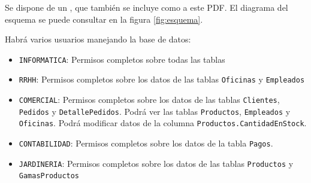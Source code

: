 Se dispone de un , que también se incluye como  a este PDF. El diagrama del esquema se puede consultar en la figura \ref{fig:esquema}.

Habrá varios usuarios manejando la base de datos:
\begin{itemize}
\item \texttt{INFORMATICA}: Permisos completos sobre todas las tablas
\item \texttt{RRHH}: Permisos completos sobre los datos de las tablas \texttt{Oficinas} y \texttt{Empleados}
\item \texttt{COMERCIAL}: Permisos completos sobre los datos de las tablas \texttt{Clientes}, \texttt{Pedidos} y \texttt{DetallePedidos}.  Podrá ver las tablas \texttt{Productos}, \texttt{Empleados} y \texttt{Oficinas}. Podrá modificar datos de la columna \texttt{Productos.CantidadEnStock}.
\item \texttt{CONTABILIDAD}: Permisos completos sobre los datos de la tabla \texttt{Pagos}.
\item \texttt{JARDINERIA}: Permisos completos sobre los datos de las tablas \texttt{Productos} y \texttt{GamasProductos}
\end{itemize}

